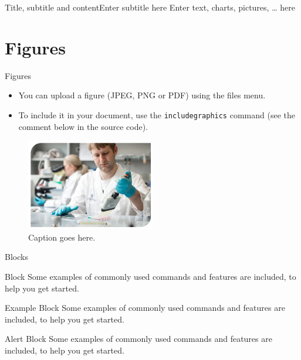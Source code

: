 \documentclass[10pt]{beamer} %
\begin{document}
\begin{frame}{Title, subtitle and content}{Enter subtitle here}
Enter text, charts, pictures, … here
\end{frame}

\section{Figures}
\begin{frame}{Figures}

\begin{itemize}
  \item You can upload a figure (JPEG, PNG or PDF) using the files menu. 
  \item To include it in your document, use the \texttt{includegraphics} command (see the comment below in the source code).
\end{itemize}

\begin{figure}
  \includegraphics[width=0.5\textwidth]{Images/image.png}
  \caption{\label{fig:your-figure}Caption goes here.}
\end{figure}

\end{frame}  

\begin{frame}{Blocks}

\begin{block}{Block}
Some examples of commonly used commands and features are included, to help you get started.
\end{block}

\begin{exampleblock}{Example Block}
Some examples of commonly used commands and features are included, to help you get started.
\end{exampleblock}

\begin{alertblock}{Alert Block}
Some examples of commonly used commands and features are included, to help you get started.
\end{alertblock}

\end{frame}
\end{document}
